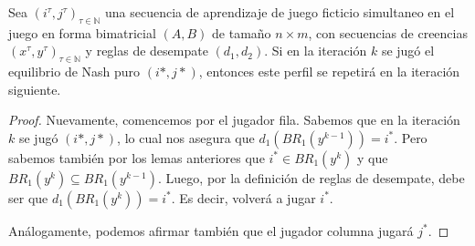 \begin{theorem}
    Sea $(i^\tau, j^\tau)_{\tau \in \mathbb{N}}$ una secuencia de aprendizaje de juego ficticio simultaneo en el juego en forma bimatricial $(A, B)$ de tamaño $n \times m$, con secuencias de creencias $(x^\tau, y^\tau)_{\tau \in \mathbb{N}}$ y reglas de desempate $(d_1, d_2)$. Si en la iteración $k$ se jugó el equilibrio de Nash puro $(i*, j*)$, entonces este perfil se repetirá en la iteración siguiente.
\end{theorem}

\begin{proof}
    Nuevamente, comencemos por el jugador fila. Sabemos que en la iteración $k$ se jugó $(i*, j*)$, lo cual nos asegura que $d_1(BR_1(y^{k-1})) = i^*$. Pero sabemos también por los lemas anteriores que $i^* \in BR_1(y^{k})$ y que $BR_1(y^{k}) \subseteq BR_1(y^{k-1})$. Luego, por la definición de reglas de desempate, debe ser que $d_1(BR_1(y^k)) = i^*$. Es decir, volverá a jugar $i^*$.

    Análogamente, podemos afirmar también que el jugador columna jugará $j^*$.
\end{proof}




